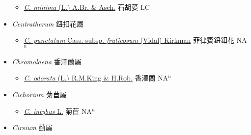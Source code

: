 \begin{itemize}
  \begin{itemize}
        \item[] \href{http://www.theplantlist.org/tpl1.1/search?q=Centipeda+minima}{\textit{C. minima} (L.) A.Br. \& Asch.}   石胡荽 LC
  \end{itemize}
 \item[] \textit{Centratherum} 鈕扣花屬
                    
  \begin{itemize}
        \item[] \href{http://www.theplantlist.org/tpl1.1/search?q=Centratherum+punctatum+subsp.+fruticosum}{\textit{C. punctatum} Cass. subsp. \textit{fruticosum} (Vidal) Kirkman}   菲律賓鈕釦花 NA$^n$
  \end{itemize}
 \item[] \textit{Chromolaena} 香澤蘭屬
                    
  \begin{itemize}
        \item[] \href{http://www.theplantlist.org/tpl1.1/search?q=Chromolaena+odorata}{\textit{C. odorata} (L.) R.M.King \& H.Rob.}   香澤蘭 NA$^n$
  \end{itemize}
 \item[] \textit{Cichorium} 菊苣屬
                    
  \begin{itemize}
        \item[] \href{http://www.theplantlist.org/tpl1.1/search?q=Cichorium+intybus}{\textit{C. intybus} L.}   菊苣 NA$^n$
  \end{itemize}
 \item[] \textit{Cirsium} 薊屬
                    

\end{itemize}
